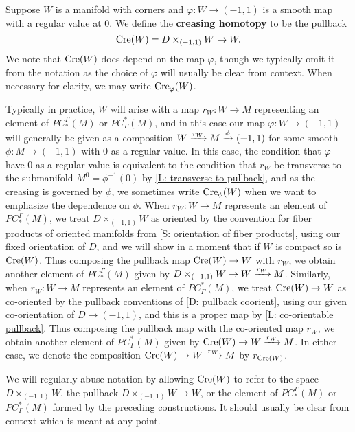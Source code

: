 \begin{definition}
	Suppose $W$ is a manifold with corners and $\varphi \colon W \to (-1,1)$ is a smooth map with a regular value at $0$.
	We define the \textbf{creasing homotopy} to be the pullback
	$$\mathrm{Cre}(W) = D\times_{(-1,1)} W \to W.$$
	We note that $\mathrm{Cre}(W)$ does depend on the map $\varphi$, though we typically omit it from the notation as the choice of $\varphi$ will usually be clear from context.
	When necessary for clarity, we may write $\mathrm{Cre}_\varphi(W)$.

	Typically in practice, $W$ will arise with a map $r_W \colon W \to M$ representing an element of $PC_*^\Gamma(M)$ or $PC^*_\Gamma(M)$, and in this case our map $\varphi \colon W \to (-1,1)$ will generally be given as a composition $W \xrightarrow{r_W}M \xrightarrow{\phi} (-1,1)$ for some smooth $\phi \colon M \to (-1,1)$ with $0$ as a regular value.
	In this case, the condition that $\varphi$ have $0$ as a regular value is equivalent to the condition that $r_W$ be transverse to the submanifold $M^0 = \phi^{-1}(0)$ by \cref{L: transverse to pullback}, and as the creasing is governed by $\phi$, we sometimes write $\mathrm{Cre}_\phi(W)$ when we want to emphasize the dependence on $\phi$.
	When $r_W \colon W \to M$ represents an element of $PC_*^\Gamma(M)$, we treat $D\times_{(-1,1)} W$ as oriented by the convention for fiber products of oriented manifolds from \cref{S: orientation of fiber products}, using our fixed orientation of $D$, and we will show in a moment that if $W$ is compact so is $\mathrm{Cre}(W)$.
	Thus composing the pullback map $\mathrm{Cre}(W) \to W$ with $r_W$, we obtain another element of $PC_*^\Gamma(M)$ given by $D\times_{(-1,1)} W \to W \xrightarrow{r_W}M$.
	Similarly, when $r_W \colon W \to M$ represents an element of $PC^*_\Gamma(M)$, we treat $\mathrm{Cre}(W) \to W$ as co-oriented by the pullback conventions of \cref{D: pullback coorient}, using our given co-orientation of $D \to (-1,1)$, and this is a proper map by \cref{L: co-orientable pullback}.
	Thus composing the pullback map with the co-oriented map $r_W$, we obtain another element of $PC^*_\Gamma(M)$ given by $\mathrm{Cre}(W) \to W \xrightarrow{r_W} M$.
	In either case, we denote the composition $\mathrm{Cre}(W) \to W \xrightarrow{r_W}M$ by $r_{\mathrm{Cre}(W)}$.

	We will regularly abuse notation by allowing $\mathrm{Cre}(W)$ to refer to the space $D\times_{(-1,1)} W$, the pullback $D\times_{(-1,1)} W \to W$, or the element of $PC_*^\Gamma(M)$ or $PC^*_\Gamma(M)$ formed by the preceding constructions.
	It should usually be clear from context which is meant at any point.
\end{definition}


